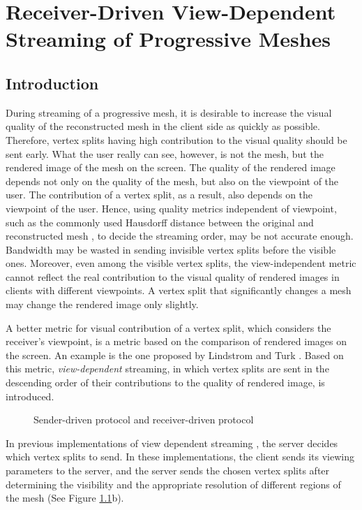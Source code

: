 \chapter{Receiver-Driven View-Dependent Streaming of Progressive Meshes}
\label{c:rdstream}
\section{Introduction}
\label{s:dstream:intro}
    During streaming of a progressive mesh, it is desirable to 
    increase the visual quality of the reconstructed mesh in the client side
    as quickly as possible. 
    Therefore, vertex splits having high contribution to the visual quality
    should be sent early. 
    What the user really can see, however, is not the mesh, but the rendered
    image of the mesh on the screen. The quality of the rendered image
    depends not only on the quality of the mesh, but also on the viewpoint
    of the user. The contribution of a vertex split, as a result, 
    also depends on the viewpoint of the user. 
    Hence, using quality metrics independent of viewpoint,
    such as the commonly used Hausdorff distance between the 
    original and reconstructed mesh \cite{cignoni98metro}, to
    decide the streaming order, may be not accurate enough. 
    Bandwidth may be wasted in sending invisible vertex splits
    before the visible ones. Moreover, even among the visible vertex splits,
    the view-independent metric cannot reflect the real contribution to
    the visual quality of rendered images in clients with different viewpoints. 
    A vertex split that significantly changes a mesh may change the rendered image 
    only slightly.

    A better metric for visual contribution of a vertex split, 
    which considers the receiver's viewpoint, is 
    a metric based on the comparison of rendered images on the screen.
    An example is the one proposed by Lindstrom and Turk \cite{353995}.
    Based on this metric, \emph{view-dependent} streaming,
    in which vertex splits are sent in the descending order of 
    their contributions to the quality of rendered image, is introduced. 
    
    \begin{figure}
    \centering
    \caption{Sender-driven protocol and receiver-driven protocol 
    \label{dstream:protocol}}
    \end{figure}
    In previous implementations of view dependent streaming
    \cite{To1999, 363375, progressive:Yang, kim:view, zheng:interactive}, 
    the server decides which vertex splits to send. In these implementations,  
    the client sends its
    viewing parameters to the server, and the server sends the chosen vertex splits after
    determining the visibility and the appropriate resolution of 
    different regions of the mesh (See Figure \ref{dstream:protocol}b).

